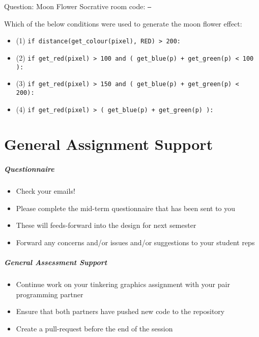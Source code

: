 \begin{frame}{Question: Moon Flower}
	Socrative room code: \texttt{---}
	
	\vspace{2em}
	
	Which of the below conditions were used to generate the moon flower effect:
	
	\begin{itemize}
    		\item (1) \lstinline{if distance(get_colour(pixel), RED) > 200:}
    		\item (2) \lstinline{if get_red(pixel) > 100 and ( get_blue(p) + get_green(p) < 100 ):}
    		\item (3) \lstinline{if get_red(pixel) > 150 and ( get_blue(p) + get_green(p) < 200):}
    		\item (4) \lstinline{if get_red(pixel) > ( get_blue(p) + get_green(p) ):}
	\end{itemize}
\end{frame}

\part{General Assignment Support}
\frame{\partpage}

\begin{frame}
	\frametitle{Questionnaire}
	\begin{itemize}
		\item Check your emails!
		\item Please complete the mid-term questionnaire that has been sent to you
		\item These will feeds-forward into the design for next semester
		\item Forward any concerns and/or issues and/or suggestions to your student reps
	\end{itemize}
\end{frame}

\begin{frame}
	\frametitle{General Assessment Support}
	\begin{itemize}
		\item Continue work on your tinkering graphics assignment with your pair programming partner
		\item Ensure that both partners have pushed new code to the repository
		\item Create a pull-request before the end of the session
	\end{itemize}
\end{frame}

